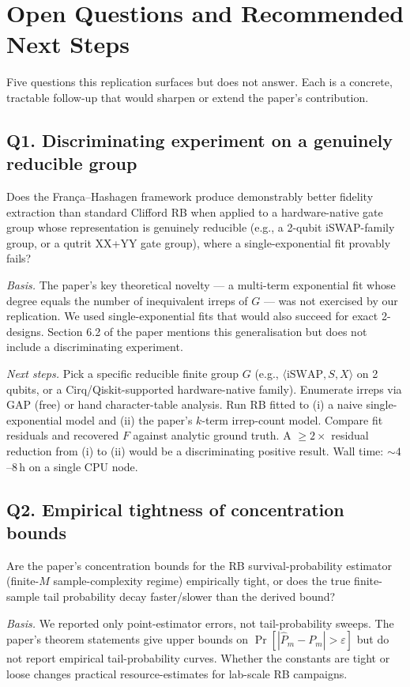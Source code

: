 \section{Open Questions and Recommended Next Steps}

Five questions this replication surfaces but does not answer. Each is a concrete, tractable follow-up that would sharpen or extend the paper's contribution.

\subsection*{Q1. Discriminating experiment on a genuinely reducible group}
Does the França--Hashagen framework produce demonstrably better fidelity extraction than standard Clifford RB when applied to a hardware-native gate group whose representation is genuinely reducible (e.g., a 2-qubit iSWAP-family group, or a qutrit XX+YY gate group), where a single-exponential fit provably fails?

\emph{Basis.} The paper's key theoretical novelty --- a multi-term exponential fit whose degree equals the number of inequivalent irreps of $G$ --- was not exercised by our replication. We used single-exponential fits that would also succeed for exact 2-designs. Section 6.2 of the paper mentions this generalisation but does not include a discriminating experiment.

\emph{Next steps.} Pick a specific reducible finite group $G$ (e.g., $\langle \mathrm{iSWAP}, S, X\rangle$ on 2 qubits, or a Cirq/Qiskit-supported hardware-native family). Enumerate irreps via GAP (free) or hand character-table analysis. Run RB fitted to (i) a naive single-exponential model and (ii) the paper's $k$-term irrep-count model. Compare fit residuals and recovered $F$ against analytic ground truth. A $\ge 2\times$ residual reduction from (i) to (ii) would be a discriminating positive result. Wall time: $\sim 4$--$8$\,h on a single CPU node.

\subsection*{Q2. Empirical tightness of concentration bounds}
Are the paper's concentration bounds for the RB survival-probability estimator (finite-$M$ sample-complexity regime) empirically tight, or does the true finite-sample tail probability decay faster/slower than the derived bound?

\emph{Basis.} We reported only point-estimator errors, not tail-probability sweeps. The paper's theorem statements give upper bounds on $\Pr[|\hat P_m - P_m| > \varepsilon]$ but do not report empirical tail-probability curves. Whether the constants are tight or loose changes practical resource-estimates for lab-scale RB campaigns.

